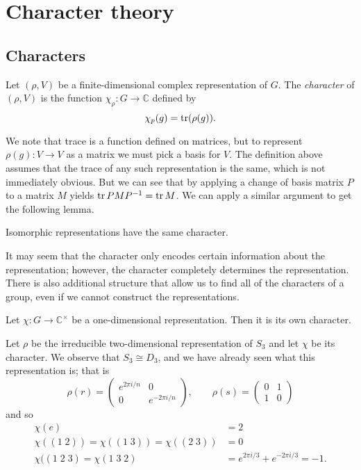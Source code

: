 \section{Character theory}

\subsection{Characters}

\begin{definition}[Character]
    Let $(\rho, V)$ be a finite-dimensional complex representation of $G$. The \emph{character} of $(\rho, V)$ is the function $\chi_\rho: G \to \mathbb C$ defined by
    \[ \chi_p(g) = \operatorname{tr}(\rho(g)). \]
\end{definition}

We note that trace is a function defined on matrices, but to represent $\rho(g): V \to V$ as a matrix we must pick a basis for $V$. The definition above assumes that the trace of any such representation is the same, which is not immediately obvious. But we can see that by applying a change of basis matrix $P$ to a matrix $M$ yields $\operatorname{tr} PMP^{-1} = \operatorname{tr} M$. We can apply a similar argument to get the following lemma.

\begin{lemma}
    Isomorphic representations have the same character.
\end{lemma}

It may seem that the character only encodes certain information about the representation; however, the character completely determines the representation. There is also additional structure that allow us to find all of the characters of a group, even if we cannot construct the representations.

\begin{example}
    Let $\chi: G \to \mathbb C^\times$ be a one-dimensional representation. Then it is its own character.
\end{example}

\begin{example}
    Let $\rho$ be the irreducible two-dimensional representation of $S_3$ and let $\chi$ be its character. We observe that $S_3 \cong D_3$, and we have already seen what this representation is; that is
    \[ \rho(r) = \begin{pmatrix}
            e^{2\pi i/n} & 0 \\ 0 & e^{-2\pi i/n}
        \end{pmatrix}, \qquad
        \rho(s) =
        \begin{pmatrix}
            0 & 1 \\ 1 & 0
        \end{pmatrix} \]
    and so
    \begin{align*}
        \chi(e)                                    & = 2                                  \\
        \chi((1\;2)) = \chi((1\;3)) = \chi((2\;3)) & = 0                                  \\
        \chi((1\;2\;3) = \chi(1\;3\;2)             & = e^{2\pi i/3} + e^{-2\pi i/3} = -1.
    \end{align*}
\end{example}

